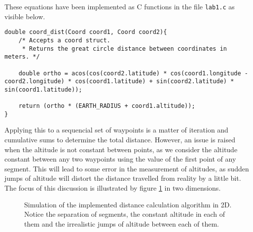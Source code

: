 \documentclass{article}
\begin{document}
These equations have been implemented as C functions in the file \texttt{lab1.c} as visible below.
\begin{verbatim}
double coord_dist(Coord coord1, Coord coord2){
    /* Accepts a coord struct.
     * Returns the great circle distance between coordinates in meters. */
    
    double ortho = acos(cos(coord2.latitude) * cos(coord1.longitude - coord2.longitude) * cos(coord1.latitude) + sin(coord2.latitude) * sin(coord1.latitude));
    
    return (ortho * (EARTH_RADIUS + coord1.altitude));
}
\end{verbatim}
Applying this to a sequencial set of waypoints is a matter of iteration and cumulative sums to determine the total distance. However, an issue is raised when the altitude is not constant between points, as we consider the altitude constant between any two waypoints using the value of the first point of any segment. This will lead to some error in the measurement of altitudes, as sudden jumps of altitude will distort the distance travelled from reality by a little bit. The focus of this discussion is illustrated by figure \ref{tikz:consth_error} in two dimensions.
\begin{figure}[ht]
    \centering
    \caption{Simulation of the implemented distance calculation algorithm in 2D. Notice the separation of segments, the constant altitude in each of them and the irrealistic jumps of altitude between each of them.}
    \label{tikz:consth_error}
\end{figure}
\end{document}
